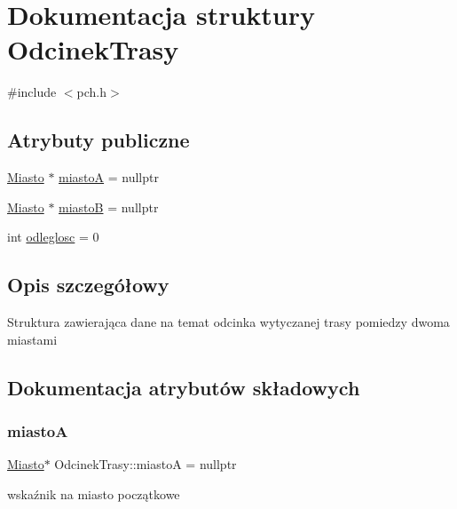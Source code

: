 \hypertarget{struct_odcinek_trasy}{}\section{Dokumentacja struktury Odcinek\+Trasy}
\label{struct_odcinek_trasy}


{\ttfamily \#include $<$pch.\+h$>$}

\subsection*{Atrybuty publiczne}
\begin{DoxyCompactItemize}
\item 
\mbox{\hyperlink{struct_miasto}{Miasto}} $\ast$ \mbox{\hyperlink{struct_odcinek_trasy_ab5690824126c6707ef3e81e9b188728d}{miastoA}} = nullptr
\item 
\mbox{\hyperlink{struct_miasto}{Miasto}} $\ast$ \mbox{\hyperlink{struct_odcinek_trasy_aaa3d3e796a9673169d6f9c83c76af8b4}{miastoB}} = nullptr
\item 
int \mbox{\hyperlink{struct_odcinek_trasy_aa32dc6880fd7a9ed73d32d3f7c7f7e70}{odleglosc}} = 0
\end{DoxyCompactItemize}


\subsection{Opis szczegółowy}
Struktura zawierająca dane na temat odcinka wytyczanej trasy pomiedzy dwoma miastami 

\subsection{Dokumentacja atrybutów składowych}
\mbox{\label{struct_odcinek_trasy_ab5690824126c6707ef3e81e9b188728d}} 
\subsubsection{\texorpdfstring{miastoA}{miastoA}}
{\footnotesize\ttfamily \mbox{\hyperlink{struct_miasto}{Miasto}}$\ast$ Odcinek\+Trasy\+::miastoA = nullptr}

wskaźnik na miasto początkowe \mbox{\label{struct_odcinek_trasy_aaa3d3e796a9673169d6f9c83c76af8b4}} 
